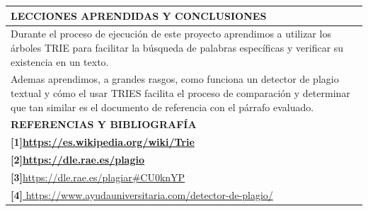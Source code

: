 \documentclass[9pt]{article}
\begin{document}
	\begin{table}[H]
		\begin{tabular}{|p{15cm}|}
			\hline 
			\rowcolor{tablebackground}
			\color{white}\textbf{LECCIONES APRENDIDAS Y CONCLUSIONES}  \\
			\hline 
			Durante el proceso de ejecución de este proyecto aprendimos a utilizar los árboles TRIE para facilitar la búsqueda de palabras específicas y verificar su existencia en un texto.\\
			Ademas aprendimos, a grandes rasgos, como funciona un detector de plagio textual y cómo el usar TRIES facilita el proceso de comparación y determinar que tan similar es el documento de referencia con el párrafo evaluado.\\
		\hline 
		\rowcolor{tablebackground}
		\color{white}\textbf{REFERENCIAS Y BIBLIOGRAFÍA}  \\
		\hline 
		\textbf{[1]\url{https://es.wikipedia.org/wiki/Trie}}\\
		\textbf{[2]\url{https://dle.rae.es/plagio}}\\
		\textbf{[3]}\url{https://dle.rae.es/plagiar#CU0knYP}\\
		\textbf{[4]}\url{	https://www.ayudauniversitaria.com/detector-de-plagio/}\\
	
	
		\hline 
	\end{tabular}
\end{table}
\end{document}

